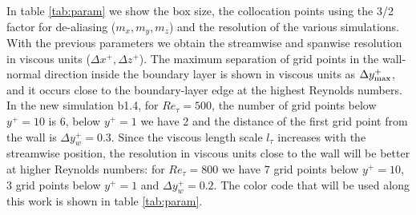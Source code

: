 In table \ref{tab:param} we show the box size, the collocation points using the 3/2 factor for de-aliasing ($m_x, m_y, m_z$) and the resolution of the various simulations. With the previous parameters we obtain the streamwise and spanwise resolution in viscous units ($\Delta x^+ , \Delta z^+$). The maximum separation of grid points in the wall-normal direction inside the boundary layer is shown in viscous units as $\Delta y_{\rm max}^+$, and it occurs close to the boundary-layer edge at the highest Reynolds numbers. In the new simulation b1.4, for $Re_{\tau}=500$, the number of grid points below $y^+=10$ is 6, below $y^+=1$ we have 2 and the distance of the first grid point from the wall is $\Delta y_w^+=0.3$. Since the viscous length scale $l_{\tau}$ increases with the streamwise position, the resolution in viscous units close to the wall will be better at higher Reynolds numbers: for $Re_{\tau}=800$ we have 7 grid points below $y^+=10$, 3 grid points below $y^+=1$ and $\Delta y_w^+=0.2$.
The color code that will be used along this work is shown in table \ref{tab:param}.

